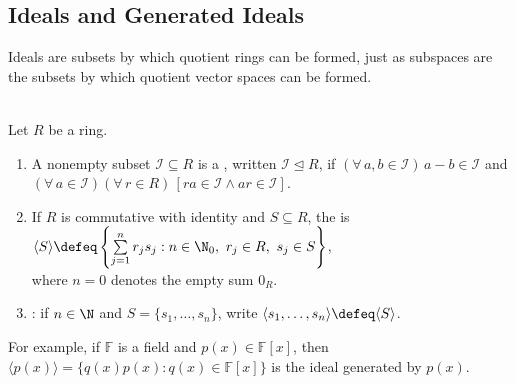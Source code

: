 \subsection{Ideals and Generated Ideals}

Ideals are subsets by which quotient rings can be formed, just as subspaces are the subsets by which quotient vector spaces can be formed.

\begin{definition} \label{def:ideal-and-generated-ideal} \\
Let $R$ be a ring.
\begin{enumerate}[label=(\roman*)]
\setlength{\itemsep}{0pt}
\item A nonempty subset $\mathcal{I}\subseteq R$ is a , written $\mathcal{I}\trianglelefteq R$, if $(\forall\,a,b\in\mathcal{I})\,a-b\in\mathcal{I}$ and $(\forall\,a\in\mathcal{I})(\forall\,r\in R)\,[ra\in\mathcal{I}\land ar\in\mathcal{I}]$.
\item If $R$ is commutative with identity and $S\subseteq R$, the  is $\langle S\rangle\defeq\left\{\sum\limits_{j=1}^{n}r_js_j:n\in\N_0,\ r_j\in R,\ s_j\in S\right\}$,\\
where $n=0$ denotes the empty sum $0_R$.
\item {}: if $n\in\N$ and $S=\{s_1,\ldots,s_n\}$, write $\langle s_1,\ldots,s_n\rangle\defeq\langle S\rangle$.
\end{enumerate}
For example, if $\mathbb{F}$ is a field and $p(x)\in\mathbb{F}[x]$, then $\langle p(x)\rangle=\{q(x)p(x):q(x)\in\mathbb{F}[x]\}$ is the  ideal generated by $p(x)$.
\end{definition}

